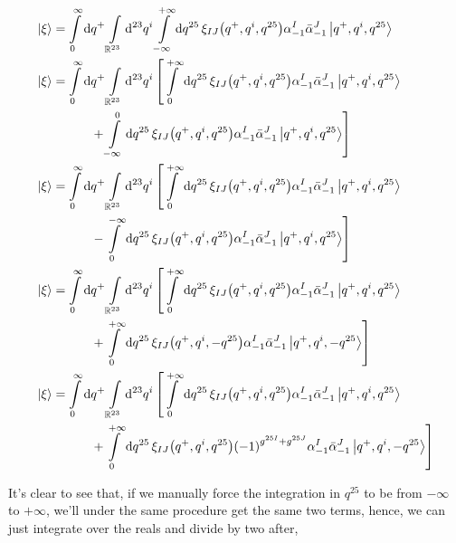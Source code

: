 \begin{align*}
    \ket{\xi}&=\int\limits_0^\infty\dd{q^+}\int\limits_{\mathbb R^{23}}\dd[23]{q^i}\int\limits_{-\infty}^{+\infty}\dd{q^{25}}\xi_{IJ}\qty(q^+,q^i,q^{25})\alpha^I_{-1}{\bar\alpha}^J_{-1}\ket{q^+,q^i,q^{25}}\\
    \ket{\xi}&=\int\limits_0^\infty\dd{q^+}\int\limits_{\mathbb R^{23}}\dd[23]{q^i}\left[\int\limits_{0}^{+\infty}\dd{q^{25}}\xi_{IJ}\qty(q^+,q^i,q^{25})\alpha^I_{-1}{\bar\alpha}^J_{-1}\ket{q^+,q^i,q^{25}}\right.\\
    &\quad\quad\quad\left.+\int\limits_{-\infty}^{0}\dd{q^{25}}\xi_{IJ}\qty(q^+,q^i,q^{25})\alpha^I_{-1}{\bar\alpha}^J_{-1}\ket{q^+,q^i,q^{25}}\right]\\
    \ket{\xi}&=\int\limits_0^\infty\dd{q^+}\int\limits_{\mathbb R^{23}}\dd[23]{q^i}\left[\int\limits_{0}^{+\infty}\dd{q^{25}}\xi_{IJ}\qty(q^+,q^i,q^{25})\alpha^I_{-1}{\bar\alpha}^J_{-1}\ket{q^+,q^i,q^{25}}\right.\\
    &\quad\quad\quad\left.-\int\limits_{0}^{-\infty}\dd{q^{25}}\xi_{IJ}\qty(q^+,q^i,q^{25})\alpha^I_{-1}{\bar\alpha}^J_{-1}\ket{q^+,q^i,q^{25}}\right]\\
    \ket{\xi}&=\int\limits_0^\infty\dd{q^+}\int\limits_{\mathbb R^{23}}\dd[23]{q^i}\left[\int\limits_{0}^{+\infty}\dd{q^{25}}\xi_{IJ}\qty(q^+,q^i,q^{25})\alpha^I_{-1}{\bar\alpha}^J_{-1}\ket{q^+,q^i,q^{25}}\right.\\
    &\quad\quad\quad\left.+\int\limits_{0}^{+\infty}\dd{q^{25}}\xi_{IJ}\qty(q^+,q^i,-q^{25})\alpha^I_{-1}{\bar\alpha}^J_{-1}\ket{q^+,q^i,-q^{25}}\right]\\
    \ket{\xi}&=\int\limits_0^\infty\dd{q^+}\int\limits_{\mathbb R^{23}}\dd[23]{q^i}\left[\int\limits_{0}^{+\infty}\dd{q^{25}}\xi_{IJ}\qty(q^+,q^i,q^{25})\alpha^I_{-1}{\bar\alpha}^J_{-1}\ket{q^+,q^i,q^{25}}\right.\\
    &\quad\quad\quad\left.+\int\limits_{0}^{+\infty}\dd{q^{25}}\xi_{IJ}\qty(q^+,q^i,q^{25})\qty(-1)^{g^{25I}+g^{25J}}\alpha^I_{-1}{\bar\alpha}^J_{-1}\ket{q^+,q^i,-q^{25}}\right]
\end{align*}

It's clear to see that, if we manually force the integration in $q^{25}$ to be from $-\infty$ to $+\infty$, we'll under the same procedure get 
the same two terms, hence, we can just integrate over the reals and divide by two after,

